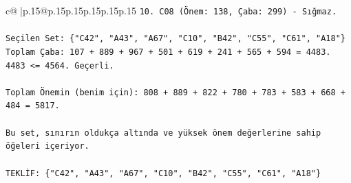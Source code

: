 \documentclass{article}
\begin{document}
{\begin{supertabular}{c@{$\;$}|p{.15\linewidth}@{}p{.15\linewidth}p{.15\linewidth}p{.15\linewidth}p{.15\linewidth}p{.15\linewidth}}
{{{\texttt{10. C08 (Önem: 138, Çaba: 299) {-} Sığmaz.} \\
\\ 
\texttt{Seçilen Set: \{"C42", "A43", "A67", "C10", "B42", "C55", "C61", "A18"\}} \\
\texttt{Toplam Çaba: 107 + 889 + 967 + 501 + 619 + 241 + 565 + 594 = 4483.} \\
\texttt{4483 <= 4564. Geçerli.} \\
\\ 
\texttt{Toplam Önemin (benim için): 808 + 889 + 822 + 780 + 783 + 583 + 668 + 484 = 5817.} \\
\\ 
\texttt{Bu set, sınırın oldukça altında ve yüksek önem değerlerine sahip öğeleri içeriyor.} \\
\\ 
\texttt{TEKLİF: \{"C42", "A43", "A67", "C10", "B42", "C55", "C61", "A18"\}} \\
            }
        }
    }
     \\ \\


\end{supertabular}}
\end{document}
